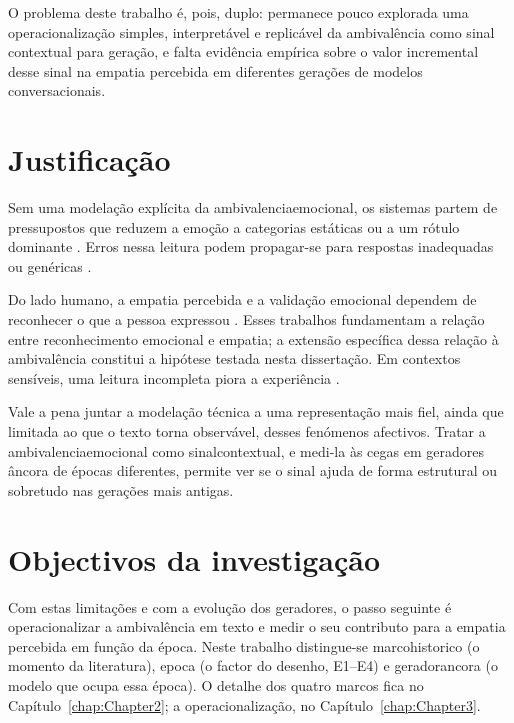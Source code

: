 O problema deste trabalho é, pois, duplo: permanece pouco explorada uma operacionalização simples, interpretável e replicável da ambivalência como sinal contextual para geração, e falta evidência empírica sobre o valor incremental desse sinal na empatia percebida em diferentes gerações de modelos conversacionais.


\section{Justificação}
\label{sec:justificacao}

Sem uma modelação explícita da \gls{ambivalenciaemocional}, os sistemas partem de pressupostos que reduzem a emoção a categorias estáticas ou a um rótulo dominante \parencite{PlazaDelArco2024Trends, Singh2026MultiEmotionIntensity}. Erros nessa leitura podem propagar-se para respostas inadequadas ou genéricas \parencite{Huangfu2025NEC}.

Do lado humano, a empatia percebida e a validação emocional dependem de reconhecer o que a pessoa expressou \parencite{Rashkin2019Empathy, Son2026EmotionalValidation}. Esses trabalhos fundamentam a relação entre reconhecimento emocional e empatia; a extensão específica dessa relação à ambivalência constitui a hipótese testada nesta dissertação. Em contextos sensíveis, uma leitura incompleta piora a experiência \parencite{Rashkin2019Empathy}.

Vale a pena juntar a modelação técnica a uma representação mais fiel, ainda que limitada ao que o texto torna observável, desses fenómenos afectivos. Tratar a \gls{ambivalenciaemocional} como \gls{sinalcontextual}, e medi-la às cegas em geradores âncora de épocas diferentes, permite ver se o sinal ajuda de forma estrutural ou sobretudo nas gerações mais antigas.


\section{Objectivos da investigação}
\label{sec:objetivos}

Com estas limitações e com a evolução dos geradores, o passo seguinte é operacionalizar a ambivalência em texto e medir o seu contributo para a empatia percebida em função da época. Neste trabalho distingue-se \gls{marcohistorico} (o momento da literatura), \gls{epoca} (o factor do desenho, E1--E4) e \gls{geradorancora} (o modelo que ocupa essa época). O detalhe dos quatro marcos fica no Capítulo~\ref{chap:Chapter2}; a operacionalização, no Capítulo~\ref{chap:Chapter3}.

